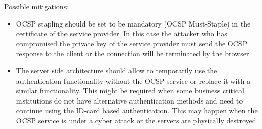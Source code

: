 Possible mitigations:
\begin{itemize}
\item OCSP stapling should be set to be mandatory (OCSP Must-Staple) in the certificate of the service provider. In this case the attacker who has compromised the private key of the service provider must send the OCSP response to the client or the connection will be terminated by the browser.

\item The server side architecture should allow to temporarily use the authentication functionality without the OCSP service or replace it with a similar functionality. This might be required when some business critical institutions do not have alternative authentication methods and need to continue using the ID-card based authentication. This may happen when the OCSP service is under a cyber attack or the servers are physically destroyed.
\end{itemize}




